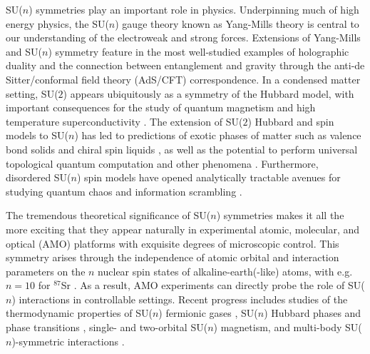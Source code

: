 \documentclass[aps,pra,nofootinbib,twocolumn,superscriptaddress]{revtex4-2}
\newcommand{\1}{\mathds{1}}
\begin{document}
SU($n$) symmetries play an important role in physics.
Underpinning much of high energy physics, the SU($n$) gauge theory known as Yang-Mills theory is central to our understanding of the electroweak and strong forces.
Extensions of Yang-Mills and SU($n$) symmetry feature in the most well-studied examples of holographic duality \cite{maldacena1999largen} and the connection between entanglement and gravity \cite{ryu2006holographic} through the anti-de Sitter/conformal field theory (AdS/CFT) correspondence.
In a condensed matter setting, SU($2$) appears ubiquitously as a symmetry of the Hubbard model, with important consequences for the study of quantum magnetism and high temperature superconductivity \cite{lee2006doping}.
The extension of SU($2$) Hubbard and spin models to SU($n$) has led to predictions of exotic phases of matter such as valence bond solids \cite{read1989valencebond, rokhsar1990quadratic, kaul2012lattice, hermele2011topological} and chiral spin liquids \cite{hermele2009mott, hermele2011topological, chen2016syntheticgaugefield, nataf2016chiral}, as well as the potential to perform universal topological quantum computation \cite{freedman2004class, nayak2008nonabelian} and other phenomena \cite{nataf2014exact, nataf2016exact}.
Furthermore, disordered SU($n$) spin models have opened analytically tractable avenues for studying quantum chaos and information scrambling \cite{sachdev1993gapless}.

The tremendous theoretical significance of SU($n$) symmetries makes it all the more exciting that they appear naturally in experimental atomic, molecular, and optical (AMO) platforms with exquisite degrees of microscopic control.
This symmetry arises through the independence of atomic orbital and interaction parameters on the $n$ nuclear spin states of alkaline-earth(-like) atoms, with e.g.~$n=10$ for ${}^{87}$Sr \cite{wu2003exact, cazalilla2009ultracold, gorshkov2010twoorbital, cazalilla2014ultracold}.
As a result, AMO experiments can directly probe the role of SU($n$) interactions in controllable settings.
Recent progress includes studies of the thermodynamic properties of SU($n$) fermionic gases \cite{hazzard2012hightemperature, bonnes2012adiabatic, stellmer2013degenerate, yip2014theory, pagano2014onedimensional, choudhury2020collective, song2020evidence, sonderhouse2020thermodynamics}, SU($n$) Hubbard phases and phase transitions \cite{taie2012su, hofrichter2016direct, taie2020observation}, single- \cite{messio2012entropy} and two-orbital \cite{cappellini2014direct, scazza2014observation, zhang2014spectroscopic, beverland2016realizing} SU($n$) magnetism, and multi-body SU($n$)-symmetric interactions \cite{goban2018emergence, perlin2019effective}.
\end{document}
